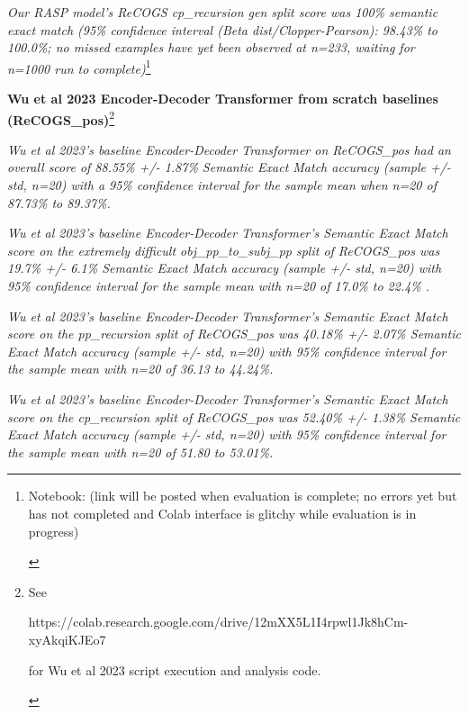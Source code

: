 \documentclass[11pt]{article}
\begin{document}
\textit{Our RASP model's ReCOGS cp\_recursion gen split score was 100\% semantic exact match (95\% confidence interval (Beta dist/Clopper-Pearson): 98.43\% to 100.0\%; no missed examples have yet been observed at n=233, waiting for n=1000 run to complete)}\footnote{ 
\begin{tiny}
Notebook: (link will be posted when evaluation is complete; no errors yet but has not completed and Colab interface is glitchy while evaluation is in progress) 
\end{tiny}
}

\textbf{Wu et al 2023 Encoder-Decoder Transformer from scratch baselines (ReCOGS\_pos)}\footnote{
\begin{tiny}
See 

https://colab.research.google.com/drive/12mXX5L1I4rpwl1Jk8hCm-xyAkqiKJEo7 

for Wu et al 2023 script execution and analysis code.
\end{tiny}
}

\textit{Wu et al 2023's baseline Encoder-Decoder Transformer on ReCOGS\_pos had an overall score of  88.55\% +/- 1.87\% Semantic Exact Match accuracy (sample +/- std, n=20) with a 95\% confidence interval for the sample mean when n=20 of 87.73\% to 89.37\%.}

\textit{Wu et al 2023's baseline Encoder-Decoder Transformer's Semantic Exact Match score on the extremely difficult obj\_pp\_to\_subj\_pp split of ReCOGS\_pos was 19.7\% +/- 6.1\% Semantic Exact Match accuracy (sample +/- std, n=20) with 95\% confidence interval for the sample mean with n=20 of 17.0\% to 22.4\% .}

\textit{Wu et al 2023's baseline Encoder-Decoder Transformer's Semantic Exact Match score on the pp\_recursion split of ReCOGS\_pos was 40.18\% +/- 2.07\% Semantic Exact Match accuracy (sample +/- std, n=20) with 95\% confidence interval for the sample mean with n=20 of 36.13 to 44.24\%.}

\textit{Wu et al 2023's baseline Encoder-Decoder Transformer's Semantic Exact Match score on the cp\_recursion split of ReCOGS\_pos was 52.40\% +/- 1.38\% Semantic Exact Match accuracy (sample +/- std, n=20) with 95\% confidence interval for the sample mean with n=20 of 51.80 to 53.01\%.}
\end{document}
